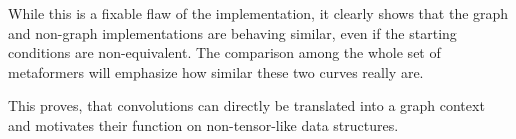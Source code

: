 While this is a fixable flaw of the implementation, it clearly shows that the graph and non-graph implementations are behaving similar, even if the starting conditions are non-equivalent.
The comparison among the whole set of metaformers will emphasize how similar these two curves really are.

This proves, that convolutions can directly be translated into a graph context and motivates their function on non-tensor-like data structures.
